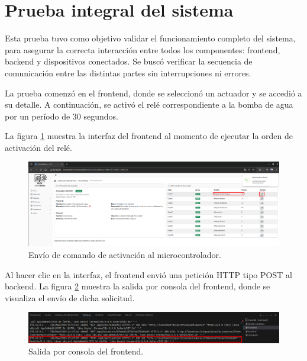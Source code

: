 \section{Prueba integral del sistema}

Esta prueba tuvo como objetivo validar el funcionamiento completo del sistema,
para asegurar la correcta interacción entre todos los componentes: frontend,
backend y dispositivos conectados. Se buscó verificar la secuencia de
comunicación entre las distintas partes sin interrupciones ni errores.

La prueba comenzó en el frontend, donde se seleccionó un actuador y se accedió
a su detalle. A continuación, se activó el relé correspondiente a la bomba de
agua por un período de 30 segundos.

La figura \ref{fig:prueba_integral_1} muestra la interfaz del frontend al
momento de ejecutar la orden de activación del relé.

\begin{figure}[H]
    \centering
    \includegraphics[width=\textwidth]{Images/59_prueba_integral_1.png}
    \caption[Envío de comando de activación al microcontrolador]{Envío de comando de activación al microcontrolador.}
    \label{fig:prueba_integral_1}
\end{figure}

Al hacer clic en la interfaz, el frontend envió una petición HTTP tipo POST al
backend. La figura \ref{fig:prueba_integral_2} muestra la salida por consola
del frontend, donde se visualiza el envío de dicha solicitud.

\begin{figure}[H]
    \centering
    \includegraphics[width=\textwidth]{Images/59_prueba_integral_2.png}
    \caption[Salida por consola del frontend]{Salida por consola del frontend.}
    \label{fig:prueba_integral_2}
\end{figure}

